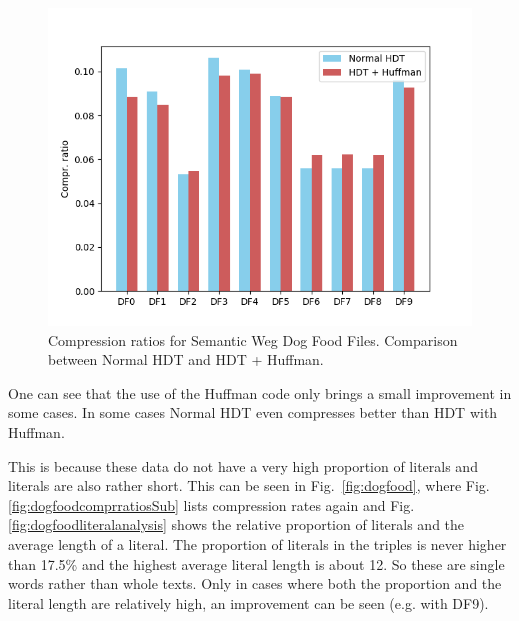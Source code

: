 \begin{figure}
	\centering
	\includegraphics[width=0.7\linewidth]{figures/4_evaluation/dogFoodComprRatios}
	\caption{Compression ratios for Semantic Weg Dog Food Files. Comparison between Normal HDT and HDT + Huffman.}
	\label{fig:dogfoodcomprratios}
\end{figure}

One can see that the use of the Huffman code only brings a small improvement in some cases. In some cases Normal HDT even compresses better than HDT with Huffman.

This is because these data do not have a very high proportion of literals and literals are also rather short. This can be seen in Fig.~\ref{fig:dogfood}, where Fig.\ref{fig:dogfoodcomprratiosSub} lists compression rates again and Fig.\ref{fig:dogfoodliteralanalysis} shows the relative proportion of literals and the average length of a literal. The proportion of literals in the triples is never higher than 17.5\% and the highest average literal length is about 12. So these are single words rather than whole texts. Only in cases where both the proportion and the literal length are relatively high, an improvement can be seen (e.g. with DF9).


